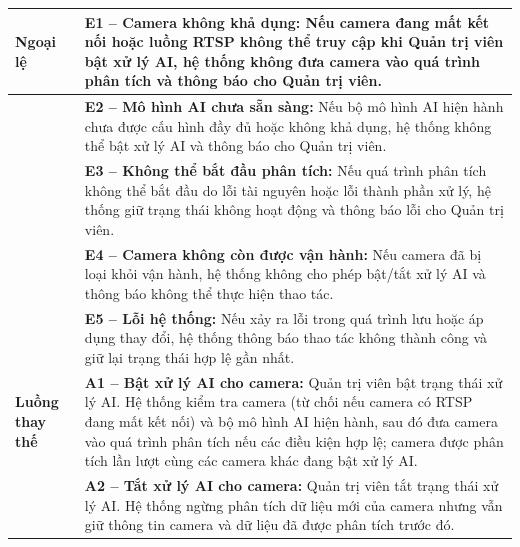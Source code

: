 \begin{longtable}{|>{\raggedright\arraybackslash}p{2.9cm}|p{12.3cm}|}
\textbf{Ngoại lệ} & \textbf{E1 -- Camera không khả dụng:} Nếu camera đang mất kết nối hoặc luồng RTSP không thể truy cập khi Quản trị viên bật xử lý AI, hệ thống không đưa camera vào quá trình phân tích và thông báo cho Quản trị viên. \\ \cline{2-2}
 & \textbf{E2 -- Mô hình AI chưa sẵn sàng:} Nếu bộ mô hình AI hiện hành chưa được cấu hình đầy đủ hoặc không khả dụng, hệ thống không thể bật xử lý AI và thông báo cho Quản trị viên. \\ \cline{2-2}
 & \textbf{E3 -- Không thể bắt đầu phân tích:} Nếu quá trình phân tích không thể bắt đầu do lỗi tài nguyên hoặc lỗi thành phần xử lý, hệ thống giữ trạng thái không hoạt động và thông báo lỗi cho Quản trị viên. \\ \cline{2-2}
 & \textbf{E4 -- Camera không còn được vận hành:} Nếu camera đã bị loại khỏi vận hành, hệ thống không cho phép bật/tắt xử lý AI và thông báo không thể thực hiện thao tác. \\ \cline{2-2}
 & \textbf{E5 -- Lỗi hệ thống:} Nếu xảy ra lỗi trong quá trình lưu hoặc áp dụng thay đổi, hệ thống thông báo thao tác không thành công và giữ lại trạng thái hợp lệ gần nhất. \\ \hline
\textbf{Luồng thay thế} & \textbf{A1 -- Bật xử lý AI cho camera:} Quản trị viên bật trạng thái xử lý AI. Hệ thống kiểm tra camera (từ chối nếu camera có RTSP đang mất kết nối) và bộ mô hình AI hiện hành, sau đó đưa camera vào quá trình phân tích nếu các điều kiện hợp lệ; camera được phân tích lần lượt cùng các camera khác đang bật xử lý AI. \\ \cline{2-2}
 & \textbf{A2 -- Tắt xử lý AI cho camera:} Quản trị viên tắt trạng thái xử lý AI. Hệ thống ngừng phân tích dữ liệu mới của camera nhưng vẫn giữ thông tin camera và dữ liệu đã được phân tích trước đó. \\ \hline
\end{longtable}

